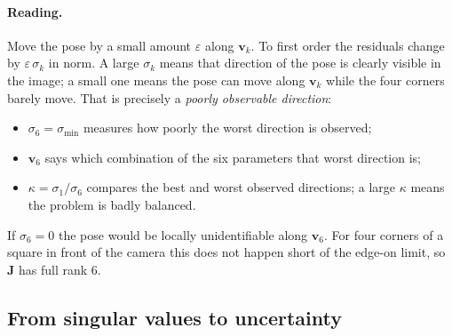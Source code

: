 \documentclass[11pt,a4paper]{article}
\theoremstyle{remark}
\newcommand{\Jmat}{\mathbf{J}}
\newcommand{\vvec}{\mathbf{v}}
\begin{document}
\paragraph{Reading.} Move the pose by a small amount $\varepsilon$ along
$\vvec_k$. To first order the residuals change by $\varepsilon\,\sigma_k$ in
norm. A large $\sigma_k$ means that direction of the pose is clearly visible
in the image; a small one means the pose can move along $\vvec_k$ while the four
corners barely move. That is precisely a \emph{poorly observable direction}:
\begin{itemize}[leftmargin=*]
  \item $\sigma_6 = \sigma_{\min}$ measures how poorly the worst direction is
        observed;
  \item $\vvec_6$ says which combination of the six parameters that worst
        direction is;
  \item $\kappa = \sigma_1/\sigma_6$ compares the best and worst observed
        directions; a large $\kappa$ means the problem is badly balanced.
\end{itemize}
If $\sigma_6 = 0$ the pose would be locally unidentifiable along $\vvec_6$. For
four corners of a square in front of the camera this does not happen short of
the edge-on limit, so $\Jmat$ has full rank $6$.

\subsection{From singular values to uncertainty}
\end{document}
